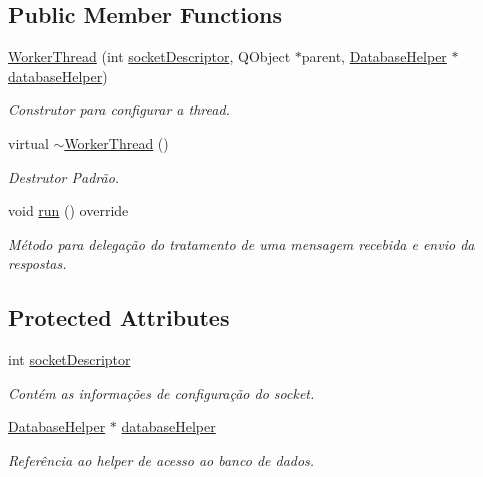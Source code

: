 \subsection*{Public Member Functions}
\begin{DoxyCompactItemize}
\item 
\hyperlink{classWorkerThread_a996fd18b3a50cd21b757713563ad4760}{Worker\+Thread} (int \hyperlink{classWorkerThread_a91f04630dd7a5a85c70513ce80eabc38}{socket\+Descriptor}, Q\+Object $\ast$parent, \hyperlink{classDatabaseHelper}{Database\+Helper} $\ast$\hyperlink{classWorkerThread_a6e4a5d94c50b922a4e2c7361e8d8656f}{database\+Helper})
\begin{DoxyCompactList}\small\item\em Construtor para configurar a thread. \end{DoxyCompactList}\item 
virtual \hyperlink{classWorkerThread_a5aa554e7d73f0f185a850ca0ef145d6d}{$\sim$\+Worker\+Thread} ()\hypertarget{classWorkerThread_a5aa554e7d73f0f185a850ca0ef145d6d}{}\label{classWorkerThread_a5aa554e7d73f0f185a850ca0ef145d6d}

\begin{DoxyCompactList}\small\item\em Destrutor Padrão. \end{DoxyCompactList}\item 
void \hyperlink{classWorkerThread_a7d48604849d66bdaa5e46b196eb745b6}{run} () override
\begin{DoxyCompactList}\small\item\em Método para delegação do tratamento de uma mensagem recebida e envio da respostas. \end{DoxyCompactList}\end{DoxyCompactItemize}
\subsection*{Protected Attributes}
\begin{DoxyCompactItemize}
\item 
int \hyperlink{classWorkerThread_a91f04630dd7a5a85c70513ce80eabc38}{socket\+Descriptor}\hypertarget{classWorkerThread_a91f04630dd7a5a85c70513ce80eabc38}{}\label{classWorkerThread_a91f04630dd7a5a85c70513ce80eabc38}

\begin{DoxyCompactList}\small\item\em Contém as informações de configuração do socket. \end{DoxyCompactList}\item 
\hyperlink{classDatabaseHelper}{Database\+Helper} $\ast$ \hyperlink{classWorkerThread_a6e4a5d94c50b922a4e2c7361e8d8656f}{database\+Helper}\hypertarget{classWorkerThread_a6e4a5d94c50b922a4e2c7361e8d8656f}{}\label{classWorkerThread_a6e4a5d94c50b922a4e2c7361e8d8656f}

\begin{DoxyCompactList}\small\item\em Referência ao helper de acesso ao banco de dados. \end{DoxyCompactList}\end{DoxyCompactItemize}
